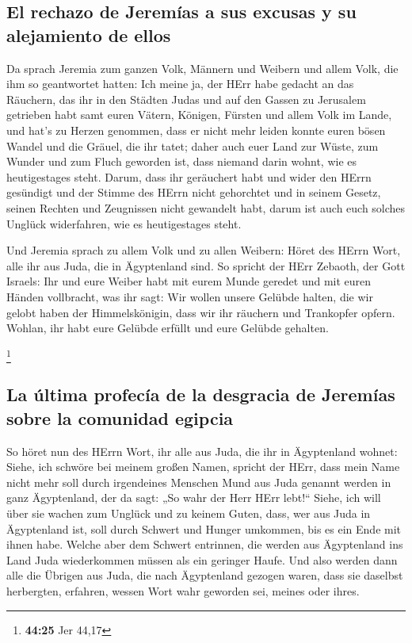 \hypertarget{el-rechazo-de-jeremuxedas-a-sus-excusas-y-su-alejamiento-de-ellos}{%
\subsection{El rechazo de Jeremías a sus excusas y su alejamiento de
ellos}\label{el-rechazo-de-jeremuxedas-a-sus-excusas-y-su-alejamiento-de-ellos}}

 Da sprach Jeremia zum ganzen Volk, Männern und Weibern
und allem Volk, die ihm so geantwortet hatten:  Ich meine
ja, der HErr habe gedacht an das Räuchern, das ihr in den Städten Judas
und auf den Gassen zu Jerusalem getrieben habt samt euren Vätern,
Königen, Fürsten und allem Volk im Lande, und hat's zu Herzen genommen,
 dass er nicht mehr leiden konnte euren bösen Wandel und
die Gräuel, die ihr tatet; daher auch euer Land zur Wüste, zum Wunder
und zum Fluch geworden ist, dass niemand darin wohnt, wie es
heutigestages steht.  Darum, dass ihr geräuchert habt und
wider den HErrn gesündigt und der Stimme des HErrn nicht gehorchtet und
in seinem Gesetz, seinen Rechten und Zeugnissen nicht gewandelt habt,
darum ist auch euch solches Unglück widerfahren, wie es heutigestages
steht.

 Und Jeremia sprach zu allem Volk und zu allen Weibern:
Höret des HErrn Wort, alle ihr aus Juda, die in Ägyptenland sind.
 So spricht der HErr Zebaoth, der Gott Israels: Ihr und
eure Weiber habt mit eurem Munde geredet und mit euren Händen
vollbracht, was ihr sagt: Wir wollen unsere Gelübde halten, die wir
gelobt haben der Himmelskönigin, dass wir ihr räuchern und Trankopfer
opfern. Wohlan, ihr habt eure Gelübde erfüllt und eure Gelübde gehalten.

\footnote{\textbf{44:25} Jer 44,17}

\hypertarget{la-uxfaltima-profecuxeda-de-la-desgracia-de-jeremuxedas-sobre-la-comunidad-egipcia}{%
\subsection{La última profecía de la desgracia de Jeremías sobre la
comunidad
egipcia}\label{la-uxfaltima-profecuxeda-de-la-desgracia-de-jeremuxedas-sobre-la-comunidad-egipcia}}

 So höret nun des HErrn Wort, ihr alle aus Juda, die ihr
in Ägyptenland wohnet: Siehe, ich schwöre bei meinem großen Namen,
spricht der HErr, dass mein Name nicht mehr soll durch irgendeines
Menschen Mund aus Juda genannt werden in ganz Ägyptenland, der da sagt:
„So wahr der Herr HErr lebt!{}``  Siehe, ich will über
sie wachen zum Unglück und zu keinem Guten, dass, wer aus Juda in
Ägyptenland ist, soll durch Schwert und Hunger umkommen, bis es ein Ende
mit ihnen habe.  Welche aber dem Schwert entrinnen, die
werden aus Ägyptenland ins Land Juda wiederkommen müssen als ein
geringer Haufe. Und also werden dann alle die Übrigen aus Juda, die nach
Ägyptenland gezogen waren, dass sie daselbst herbergten, erfahren,
wessen Wort wahr geworden sei, meines oder ihres.

